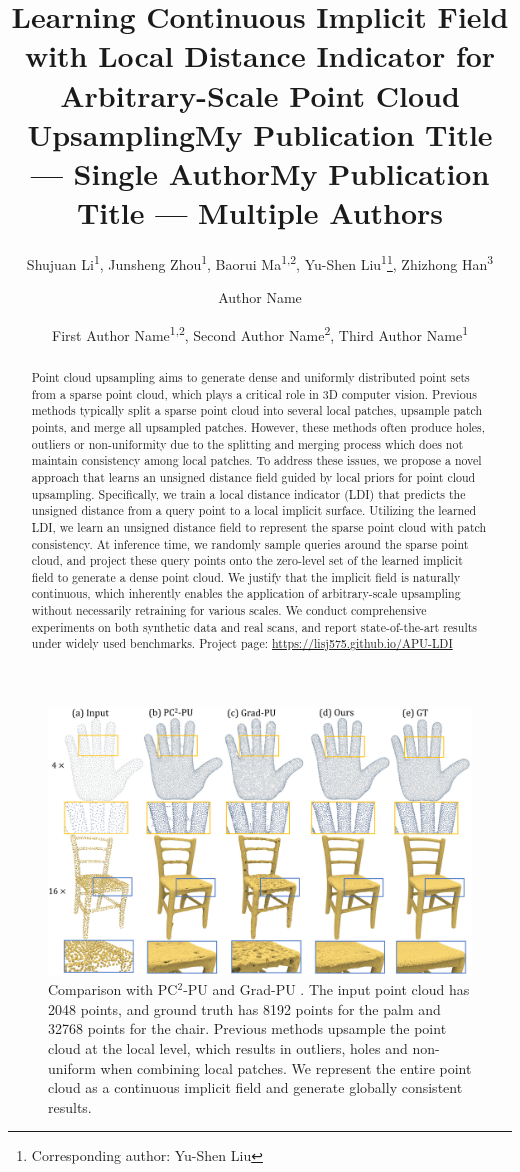 \documentclass[letterpaper]{article} %
\title{Learning Continuous Implicit Field with Local Distance Indicator for Arbitrary-Scale Point Cloud Upsampling}
\author{
    Shujuan Li\textsuperscript{\rm 1}\equalcontrib, 
    Junsheng Zhou\textsuperscript{\rm 1}\equalcontrib, 
    Baorui Ma\textsuperscript{\rm 1,2},
    Yu-Shen Liu\textsuperscript{\rm 1}\thanks{Corresponding author: Yu-Shen Liu}, 
    Zhizhong Han\textsuperscript{\rm 3}
}
\title{My Publication Title --- Single Author}
\author {
    Author Name
}
\title{My Publication Title --- Multiple Authors}
\author {
    First Author Name\textsuperscript{\rm 1,\rm 2},
    Second Author Name\textsuperscript{\rm 2},
    Third Author Name\textsuperscript{\rm 1}
}
\begin{document}
\maketitle
\begin{abstract}
Point cloud upsampling aims to generate dense and uniformly distributed point sets from a sparse point cloud, which plays a critical role in 3D computer vision. Previous methods typically split a sparse point cloud into several local patches, upsample patch points, and merge all upsampled patches. However, these methods often produce holes, outliers or non-uniformity due to the splitting and merging process which does not maintain consistency among local patches.
To address these issues, we propose a novel approach that learns an unsigned distance field guided by local priors for point cloud upsampling. Specifically, we train a local distance indicator (LDI) that predicts the unsigned distance from a query point to a local implicit surface. Utilizing the learned LDI, we learn an unsigned distance field to represent the sparse point cloud with patch consistency. At inference time, we randomly sample queries around the sparse point cloud, and project these query points onto the zero-level set of the learned implicit field to generate a dense point cloud. 
We justify that the implicit field is naturally continuous, which inherently enables the application of arbitrary-scale upsampling without necessarily retraining for various scales. We conduct comprehensive experiments on both synthetic data and real scans, and report state-of-the-art results under widely used benchmarks. Project page: \url{https://lisj575.github.io/APU-LDI}
\end{abstract}

\begin{figure}
\centering
\includegraphics[width=0.95\linewidth]{methods_compare.pdf}
\caption{Comparison with PC$^2$-PU \cite{long2022pc2} and Grad-PU \cite{he2023grad}. The input point cloud has 2048 points, and ground truth has 8192 points for the palm and 32768 points for the chair. Previous methods upsample the point cloud at the local level, which results in outliers, holes and non-uniform when combining local patches. We represent the entire point cloud as a continuous implicit field and generate globally consistent results.}
\label{fig:methods_cpmparison}
\end{figure}
\end{document}
